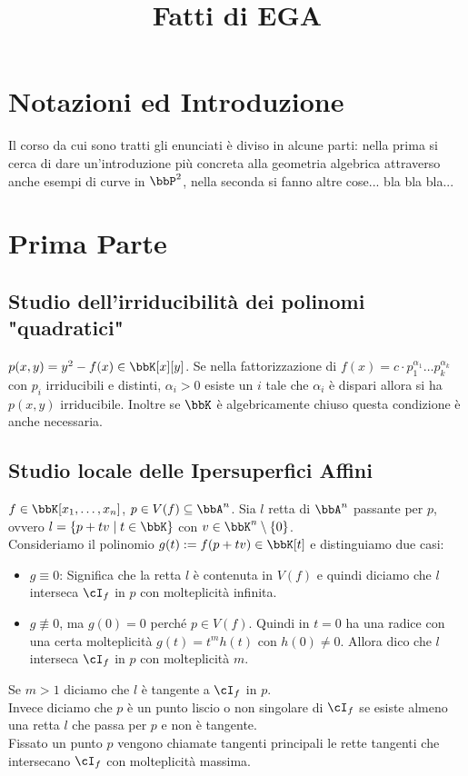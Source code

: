 \documentclass[a4paper,NoNotes,GeneralMath]{stdmdoc}
\begin{document}
	\title{Fatti di EGA}
	
	\section*{Notazioni ed Introduzione}
	Il corso da cui sono tratti gli enunciati è diviso in alcune parti: nella prima si cerca di dare un'introduzione più concreta alla geometria algebrica attraverso anche esempi di curve in $\bbP^2$, nella seconda si fanno altre cose... bla bla bla...

	\section*{Prima Parte}

	\subsection*{Studio dell'irriducibilità dei polinomi "quadratici"}	
	$p(x,y) = y^2 - f(x) \in \bbK[x][y]$. Se nella fattorizzazione di $f(x) = c \cdot p_1^{\alpha_1} \ldots p_k^{\alpha_k}$ con $p_i$ irriducibili e distinti, $\alpha_i > 0$ esiste un $i$ tale che $\alpha_i$ è dispari allora si ha $p(x,y)$ irriducibile. Inoltre se $\bbK$ è algebricamente chiuso questa condizione è anche necessaria.

	\subsection*{Studio locale delle Ipersuperfici Affini}
	$f \in \bbK[x_1, \ldots, x_n]$, $p \in V(f) \subseteq \bbA^n$. Sia $l$ retta di $\bbA^n$ passante per $p$, ovvero $l = \{p + tv \mid t \in \bbK \}$ con $v \in \bbK^n \setminus \{0\}$. \\

	Consideriamo il polinomio $g(t) := f(p + tv) \in \bbK[t]$ e distinguiamo due casi:
	\begin{itemize}
		\item $g \equiv 0$: Significa che la retta $l$ è contenuta in $V(f)$ e quindi diciamo che $l$ interseca $\cI_f$ in $p$ con molteplicità infinita.
		\item $g \not\equiv 0$, ma $g(0) = 0$ perché $p \in V(f)$. Quindi in $t=0$ ha una radice con una certa molteplicità $g(t) = t^m h(t)$ con $h(0) \neq 0$. Allora dico che $l$ interseca $\cI_f$ in $p$ con molteplicità $m$.
	\end{itemize}
	Se $m > 1$ diciamo che $l$ è tangente a $\cI_f$ in $p$. \\
	Invece diciamo che $p$ è un punto liscio o non singolare di $\cI_f$ se esiste almeno una retta $l$ che passa per $p$ e non è tangente. \\
	Fissato un punto $p$ vengono chiamate tangenti principali le rette tangenti che intersecano $\cI_f$ con molteplicità massima.
\end{document}
